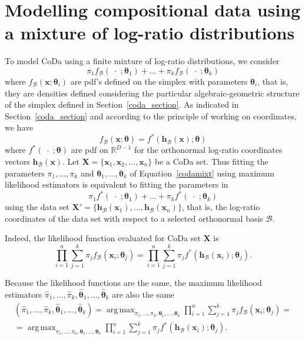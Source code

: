 \documentclass[12pt, a4paper]{article}
\newcommand{\m}[1]{\boldsymbol{#1}}
\DeclareMathOperator*{\argmax}{arg\,max}
\theoremstyle{definition}
\begin{document}
\section{Modelling compositional data using a mixture of log-ratio distributions}
\label{codamix_section}

\noindent To model CoDa using a finite mixture of log-ratio distributions, we consider 
\begin{equation}
\pi_1 f_\mathcal{B}(\;\cdot\; ; \m\theta_1) + \dots + \pi_k f_\mathcal{B}(\;\cdot\; ; \m\theta_k)
\label{codamixt}
\end{equation}
where $f_\mathcal{B}(\textbf{x} ; \m\theta_i)$ are pdf's defined on the simplex with parameters $\m\theta_i$, that is, they are densities defined considering the particular algebraic-geometric structure of the simplex defined in Section~\ref{coda_section}. As  indicated in Section~\ref{coda_section} and according to the principle of working on coordinates, we have
\[f_\mathcal{B}(\textbf{x} ; \m\theta) = f^*(\textbf{h}_\mathcal{B}(\textbf{x}) ; \m\theta)\]
where $f^*(\;\cdot\; ; \m\theta)$ are pdf on $\mathbb{R}^{D-1}$ for the orthonormal log-ratio coordinates vectors $\textbf{h}_\mathcal{B}(\textbf{x})$. Let $\mathbf{X} =  \{ \textbf{x}_1, \textbf{x}_2, \dots , \textbf{x}_n \}$ be a CoDa set. 
Thus fitting the parameters $\pi_1, \dots, \pi_k$ and $\m\theta_1, \dots, \m\theta_k$ of Equation~\ref{codamixt} using maximum likelihood estimators is equivalent to fitting the parameters in
\begin{equation}
\pi_1 f^*(\;\cdot\; ; \m\theta_1) + \dots + \pi_k f^*(\;\cdot\; ; \m\theta_k)
\label{coordmixt}
\end{equation}
using the data set $\mathbf{X}' = \{ \textbf{h}_\mathcal{B}(\mathbf{x}_1), \dots, \textbf{h}_\mathcal{B}(\mathbf{x}_n) \}$, that is, the log-ratio coordinates of the data set with respect to a selected orthonormal basis $\mathcal{B}$.

Indeed, the likelihood function evaluated for CoDa set $\mathbf{X}$ is
\begin{equation}\label{likeli1}
\prod_{i=1}^n \sum_{j=1}^k \pi_j f_\mathcal{B}(\textbf{x}_i; \m\theta_j)=\prod_{i=1}^n \sum_{j=1}^k \pi_j f^*(\textbf{h}_\mathcal{B}(\textbf{x}_i); \m\theta_j).
\end{equation}

Because the likelihood functions are the same,  the maximum likelihood estimators $\hat{\pi}_1, \dots, \hat{\pi}_k, \hat{\m\theta}_1, \dots, \hat{\m\theta}_k$ are also the same
\begin{eqnarray}\label{likeli2}
\left( \hat{\pi}_1, \dots, \hat{\pi}_k, \hat{\m\theta}_1, \dots, \hat{\m\theta}_k\right) = \argmax_{\pi_1, \dots, \pi_k, \m\theta_1, \dots, \m\theta_k} \prod_{i=1}^n \sum_{j=1}^k \pi_j f_\mathcal{B}(\textbf{x}_i; \m\theta_j) = \\ 
= \argmax_{\pi_1, \dots, \pi_k, \m\theta_1, \dots, \m\theta_k} \prod_{i=1}^n \sum_{j=1}^k \pi_j f^*(\textbf{h}_\mathcal{B}(\textbf{x}_i); \m\theta_j).
\end{eqnarray}
\end{document}
